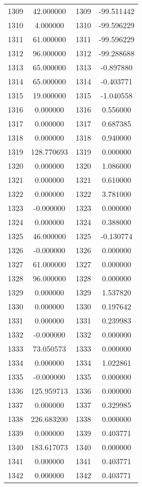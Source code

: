 \documentclass[12pt]{article}
\begin{document}
\begin{longtable}{@{}cccc@{}}
1309 & 42.000000 & 1309 & -99.511442 \\
1310 & 4.000000 & 1310 & -99.596229 \\
1311 & 61.000000 & 1311 & -99.596229 \\
1312 & 96.000000 & 1312 & -99.288688 \\
1313 & 65.000000 & 1313 & -0.897880 \\
1314 & 65.000000 & 1314 & -0.403771 \\
1315 & 19.000000 & 1315 & -1.040558 \\
1316 & 0.000000 & 1316 & 0.556000 \\
1317 & 0.000000 & 1317 & 0.687385 \\
1318 & 0.000000 & 1318 & 0.940000 \\
1319 & 128.770693 & 1319 & 0.000000 \\
1320 & 0.000000 & 1320 & 1.086000 \\
1321 & 0.000000 & 1321 & 0.610000 \\
1322 & 0.000000 & 1322 & 3.781000 \\
1323 & -0.000000 & 1323 & 0.000000 \\
1324 & 0.000000 & 1324 & 0.388000 \\
1325 & 46.000000 & 1325 & -0.130774 \\
1326 & -0.000000 & 1326 & 0.000000 \\
1327 & 61.000000 & 1327 & 0.000000 \\
1328 & 96.000000 & 1328 & 0.000000 \\
1329 & 0.000000 & 1329 & 1.537820 \\
1330 & 0.000000 & 1330 & 0.197642 \\
1331 & 0.000000 & 1331 & 0.239983 \\
1332 & -0.000000 & 1332 & 0.000000 \\
1333 & 73.050573 & 1333 & 0.000000 \\
1334 & 0.000000 & 1334 & 1.022861 \\
1335 & -0.000000 & 1335 & 0.000000 \\
1336 & 125.959713 & 1336 & 0.000000 \\
1337 & 0.000000 & 1337 & 0.329985 \\
1338 & 226.683200 & 1338 & 0.000000 \\
1339 & 0.000000 & 1339 & 0.403771 \\
1340 & 183.617073 & 1340 & 0.000000 \\
1341 & 0.000000 & 1341 & 0.403771 \\
1342 & 0.000000 & 1342 & 0.403771 \\

\end{longtable}
\end{document}
